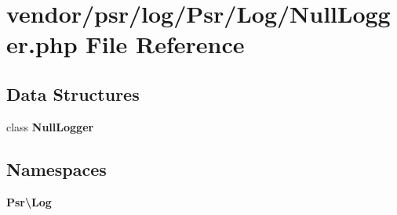 \section{vendor/psr/log/\+Psr/\+Log/\+Null\+Logger.php File Reference}
\label{psr_2log_2_psr_2_log_2_null_logger_8php}
\subsection*{Data Structures}
\begin{DoxyCompactItemize}
\item 
class {\bf Null\+Logger}
\end{DoxyCompactItemize}
\subsection*{Namespaces}
\begin{DoxyCompactItemize}
\item 
 {\bf Psr\textbackslash{}\+Log}
\end{DoxyCompactItemize}
